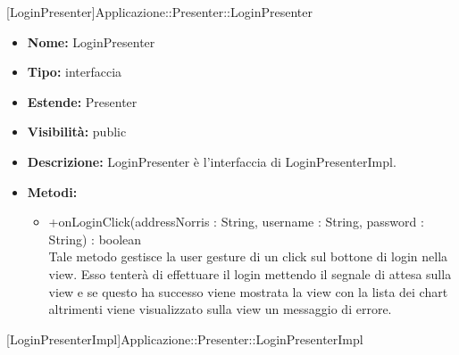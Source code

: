 			
			[LoginPresenter]{Applicazione::Presenter::LoginPresenter}
			

	
			
			\begin{itemize}
			\item \textbf{Nome:} LoginPresenter
			\item \textbf{Tipo:} interfaccia
			
		\item \textbf{Estende:}
		Presenter
			\item \textbf{Visibilità:} public
			\item \textbf{Descrizione:} LoginPresenter è l'interfaccia di LoginPresenterImpl.
			\item \textbf{Metodi:}
				\begin{itemize}
				\setlength{\itemsep}{5pt}
				
					\item[\ding{111}] {{+onLoginClick(addressNorris : String, username : String, password : String) : boolean}} \\ [1mm] Tale metodo gestisce la user gesture di un click sul bottone di login nella view. Esso tenterà di effettuare il login mettendo il segnale di attesa sulla view e se questo ha successo viene mostrata la view con la lista dei chart altrimenti viene visualizzato sulla view un messaggio di errore.
				\end{itemize}
		
			\end{itemize}

			
			[LoginPresenterImpl]{Applicazione::Presenter::LoginPresenterImpl}
			

	
